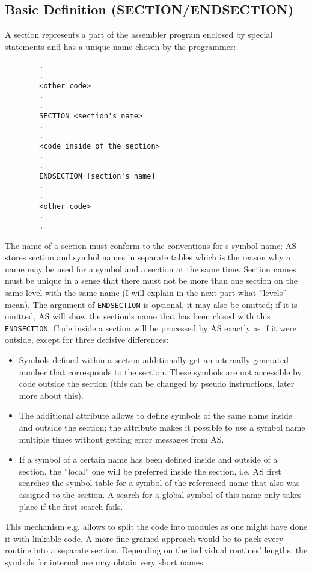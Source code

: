 \documentclass[12pt,twoside]{report}
\makeatletter
\newcommand{\tty}[1]{{\tt #1}}
\newcommand{\ttindex}[1]{\index{#1@{\tt #1}}}
\makeatother
\begin{document}

\subsection{Basic Definition (SECTION/ENDSECTION)}
\ttindex{SECTION}\ttindex{ENDSECTION}

A section represents a part of the assembler program enclosed by
special statements and has a unique name chosen by the programmer:
\begin{verbatim}
        .
        .
        <other code>
        .
        .
        SECTION <section's name>
        .
        .
        <code inside of the section>
        .
        .
        ENDSECTION [section's name]
        .
        .
        <other code>
        .
        .
\end{verbatim}
The name of a section must conform to the conventions for s symbol
name; AS stores section and symbol names in separate tables which is
the reason why a name may be used for a symbol and a section at the
same time.  Section names must be unique in a sense that there must
not be more than one section on the same level with the same name (I
will explain in the next part what ''levels'' mean).  The argument of
\tty{ENDSECTION} is optional, it may also be omitted; if it is omitted, AS
will show the section's name that has been closed with this
\tty{ENDSECTION}.  Code inside a section will be processed by AS exactly
as if it were outside, except for three decisive differences:
\begin{itemize}
\item{Symbols defined within a section additionally get an internally
      generated number that corresponds to the section.  These symbols
      are not accessible by code outside the section (this can be
      changed by pseudo instructions, later more about this).}
\item{The additional attribute allows to define symbols of the same
      name inside and outside the section; the attribute makes it
      possible to use a symbol name multiple times without getting error
      messages from AS.}
\item{If a symbol of a certain name has been defined inside and outside
      of a section, the ''local'' one will be preferred inside the
      section, i.e. AS first searches the symbol table for a symbol of
      the referenced name that also was assigned to the section.  A
      search for a global symbol of this name only takes place if the
      first search fails.}
\end{itemize}
This mechanism e.g. allows to split the code into modules as one
might have done it with linkable code.  A more fine-grained approach
would be to pack every routine into a separate section.  Depending on
the individual routines' lengths, the symbols for internal use may
obtain very short names.
\end{document}
